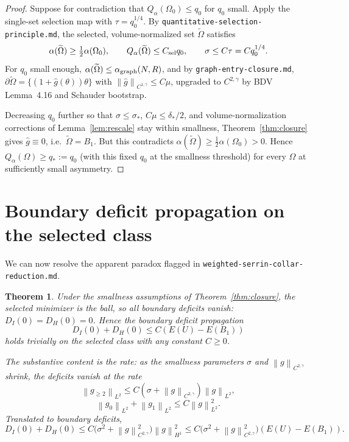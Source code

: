 \documentclass[11pt]{article}
\newtheorem{theorem}{Theorem}
\theoremstyle{definition}
\newcommand{\norm}[1]{\left\|#1\right\|}
\begin{document}
\begin{proof}
Suppose for contradiction that $Q_\alpha(\Omega_0)\le q_0$ for $q_0$ small.
Apply the single-set selection map with $\tau=q_0^{1/4}$. By
\texttt{quantitative-selection-principle.md}, the selected, volume-normalized
set $\widetilde\Omega$ satisfies
\[
\alpha(\widetilde\Omega)\ge\tfrac12\alpha(\Omega_0),\qquad
Q_\alpha(\widetilde\Omega)\le C_{\rm sel}q_0,\qquad
\sigma\le C\tau=Cq_0^{1/4}.
\]
For $q_0$ small enough, $\alpha(\widetilde\Omega)\le\alpha_{\rm graph}(N,R)$,
and by \texttt{graph-entry-closure.md},
$\partial\widetilde\Omega=\{(1+\widehat g(\theta))\theta\}$ with
$\norm{\widehat g}_{C^{1,\gamma}}\le C\mu$, upgraded to $C^{2,\gamma}$ by
BDV Lemma~4.16 and Schauder bootstrap.

Decreasing $q_0$ further so that $\sigma\le\sigma_*$,
$C\mu\le\delta_*/2$, and volume-normalization corrections of
Lemma~\ref{lem:rescale} stay within smallness, Theorem~\ref{thm:closure}
gives $\widehat g\equiv0$, i.e.\ $\widetilde\Omega=B_1$. But this contradicts
$\alpha(\widetilde\Omega)\ge\tfrac12\alpha(\Omega_0)>0$. Hence
$Q_\alpha(\Omega)\ge q_*:=q_0$ (with this fixed $q_0$ at the smallness
threshold) for every $\Omega$ at sufficiently small asymmetry.
\end{proof}

\section{Boundary deficit propagation on the selected class}\label{sec:bdp}

We can now resolve the apparent paradox flagged in
\texttt{weighted-serrin-collar-reduction.md}.

\begin{theorem}\label{thm:bdp-selected}
Under the smallness assumptions of Theorem~\ref{thm:closure}, the selected
minimizer is the ball, so all boundary deficits vanish: $D_I(0)=D_H(0)=0$.
Hence the boundary deficit propagation
\[
D_I(0)+D_H(0)\le C(E(U)-E(B_1))
\]
holds trivially on the selected class with any constant $C\ge0$.

The substantive content is the \emph{rate}: as the smallness parameters
$\sigma$ and $\norm{g}_{C^{2,\gamma}}$ shrink, the deficits vanish at the
rate
\[
\norm{g_{\ge2}}_{L^2}\le C(\sigma+\norm{g}_{C^{2,\gamma}})\norm{g}_{L^2},
\]
\[
\norm{g_0}_{L^2}+\norm{g_1}_{L^2}\le C\norm{g}_{L^2}^2.
\]
Translated to boundary deficits,
\[
D_I(0)+D_H(0)
\le C\bigl(\sigma^2+\norm{g}_{C^{2,\gamma}}^2\bigr)\norm{g}_{H^1}^2
\le C\bigl(\sigma^2+\norm{g}_{C^{2,\gamma}}^2\bigr)(E(U)-E(B_1)).
\]
\end{theorem}
\end{document}
